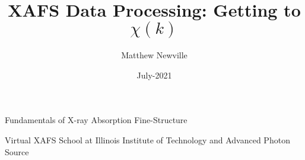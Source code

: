 \documentclass[9pt,aspectratio=1610]{beamer}
\begin{document}
\title[Virtual XAFS School]{XAFS Data Processing: Getting to $\chi(k)$}
\author[M Newville]{Matthew Newville}
\date{July-2021}


\begin{frame} \titlepage
  \vmm
  \begin{center}
    Fundamentals of X-ray Absorption Fine-Structure
  \end{center}

  \vmm

  \begin{cenpage}{60mm}
    Virtual XAFS School at Illinois Institute of Technology and Advanced
  Photon Source
\end{cenpage}
\end{frame}






% 

% 
\end{document}

